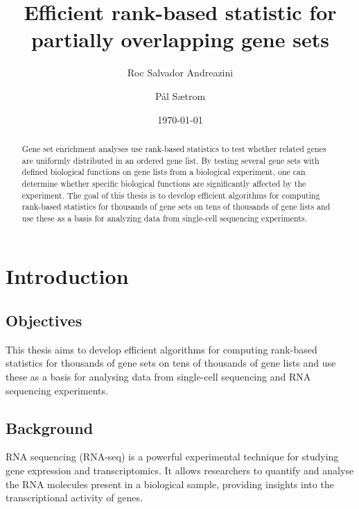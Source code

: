\documentclass[aps,prb,twocolumn,superscriptaddress,floatfix,longbibliography]{revtex4-2}
\newif\ifptitle
\newif\ifpnumber
\newcounter{para}
\newcommand\ptitle[1]{\par\refstepcounter{para}
{\ifpnumber{\noindent\textcolor{lightgray}{\textbf{\thepara}}\indent}\fi}
{\ifptitle{\textbf{[{#1}]}}\fi}}
\newcommand{\mytitle}{Efficient rank-based statistic for partially overlapping gene sets}
\begin{document}
\title{\mytitle}

\author{Roc Salvador Andreazini}
\author{Pål Sætrom}


\date{\today}

\begin{abstract}
Gene set enrichment analyses use rank-based statistics to test whether related genes are uniformly distributed in an ordered gene list. By testing several gene sets with defined biological functions on gene lists from a biological experiment, one can determine whether specific biological functions are significantly affected by the experiment. The goal of this thesis is to develop efficient algorithms for computing rank-based statistics for thousands of gene sets on tens of thousands of gene lists and use these as a basis for analyzing data from single-cell sequencing experiments.
\end{abstract}

\maketitle
\section{\label{sec:Start}Introduction}

\subsection{Objectives} This thesis aims to develop efficient algorithms for computing rank-based statistics for thousands of gene sets on tens of thousands of gene lists and use these as a basis for analysing data from single-cell sequencing and RNA sequencing experiments.

\subsection{Background}

\ptitle{RNA sequencing} RNA sequencing (RNA-seq) is a powerful experimental technique for studying gene expression and transcriptomics. It allows researchers to quantify and analyse the RNA molecules present in a biological sample, providing insights into the transcriptional activity of genes.
\end{document}
